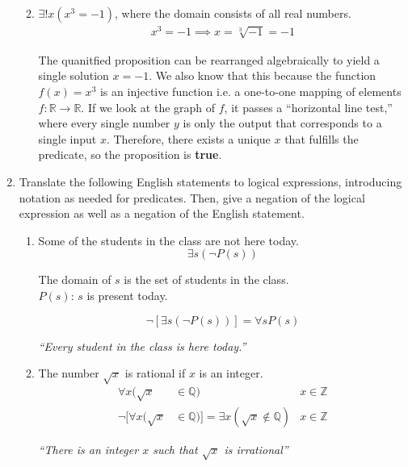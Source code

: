 \documentclass[letterpaper, 12pt]{article}
\newcommand{\keyword}[1]{\textbf{#1}}
\begin{document}
\begin{enumerate}
\begin{enumerate}
\begin{flushleft}
\end{flushleft}
\item $\exists! x (x^3 = -1)$, where the domain consists of all real numbers.
\begin{gather*}
    x^3 = -1 \implies x = \sqrt[3]{-1} = -1
\end{gather*}
\begin{flushleft}
    The quanitfied proposition can be rearranged algebraically to yield a single solution $x = -1$.
    We also know that this because the function $f(x) = x^3$ is an injective function i.e. a 
    one-to-one mapping of elements $f: \mathbb{R} \rightarrow \mathbb{R}$. If we look at the graph
    of $f$, it passes a ``horizontal line test,'' where every single number $y$ is only the output
    that corresponds to a single input $x$. Therefore, there exists a unique $x$ that fulfills
    the predicate, so the proposition is \keyword{true}.
\end{flushleft}
\end{enumerate}
\pagebreak
\item Translate the following English statements to logical expressions, introducing notation as
needed for predicates. Then, give a negation of the logical expression as well as a negation of
the English statement.
\begin{enumerate}
\item Some of the students in the class are not here today.
\[\exists s (\neg P(s))\]
\begin{flushleft}
    The domain of $s$ is the set of students in the class. \\
    $P(s)$: $s$ is present today.
\end{flushleft}
\[\neg[\exists s (\neg P(s))] = \forall s P(s)\]
\begin{flushleft}
    \textit{``Every student in the class is here today.''}
\end{flushleft}
\item The number $\sqrt{x}$ is rational if $x$ is an integer.
\begin{align*}
    \forall x (\sqrt{x} &\in \mathbb{Q}) &x \in \mathbb{Z} \\
    \neg[\forall x (\sqrt{x} &\in \mathbb{Q})] = \exists x (\sqrt{x} \notin \mathbb{Q})
    &x \in \mathbb{Z}
\end{align*}
\begin{flushleft}
    \textit{``There is an integer $x$ such that $\sqrt{x}$ is irrational''}
\end{flushleft}
\end{enumerate}
\end{enumerate}
\end{document}
